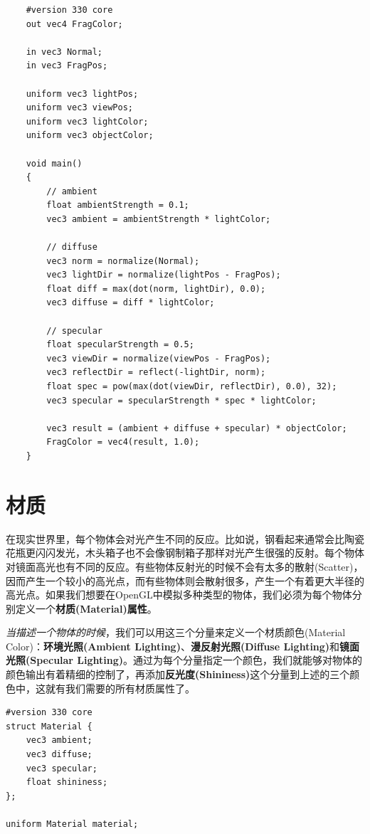 \documentclass[UTF8,a4paper,12pt]{ctexbook}
\begin{document}
				\begin{lstlisting}
	#version 330 core
	out vec4 FragColor;
	
	in vec3 Normal;  
	in vec3 FragPos;  
	  
	uniform vec3 lightPos; 
	uniform vec3 viewPos; 
	uniform vec3 lightColor;
	uniform vec3 objectColor;
	
	void main()
	{
	    // ambient
	    float ambientStrength = 0.1;
	    vec3 ambient = ambientStrength * lightColor;
	  	
	    // diffuse 
	    vec3 norm = normalize(Normal);
	    vec3 lightDir = normalize(lightPos - FragPos);
	    float diff = max(dot(norm, lightDir), 0.0);
	    vec3 diffuse = diff * lightColor;
	    
	    // specular
	    float specularStrength = 0.5;
	    vec3 viewDir = normalize(viewPos - FragPos);
	    vec3 reflectDir = reflect(-lightDir, norm);  
	    float spec = pow(max(dot(viewDir, reflectDir), 0.0), 32);
	    vec3 specular = specularStrength * spec * lightColor;  
	        
	    vec3 result = (ambient + diffuse + specular) * objectColor;
	    FragColor = vec4(result, 1.0);
	} 				
				\end{lstlisting}
			
			
			
	\section{材质}
		在现实世界里，每个物体会对光产生不同的反应。比如说，钢看起来通常会比陶瓷花瓶更闪闪发光，木头箱子也不会像钢制箱子那样对光产生很强的反射。每个物体对镜面高光也有不同的反应。有些物体反射光的时候不会有太多的散射(Scatter)，因而产生一个较小的高光点，而有些物体则会散射很多，产生一个有着更大半径的高光点。如果我们想要在OpenGL中模拟多种类型的物体，我们必须为每个物体分别定义一个\textbf{材质(Material)属性}。
		
		\textit{当描述一个物体的时候}，我们可以用这三个分量来定义一个材质颜色(Material Color)：\textbf{环境光照(Ambient Lighting)}、\textbf{漫反射光照(Diffuse Lighting)}和\textbf{镜面光照(Specular Lighting)}。通过为每个分量指定一个颜色，我们就能够对物体的颜色输出有着精细的控制了，再添加\textbf{反光度(Shininess)}这个分量到上述的三个颜色中，这就有我们需要的所有材质属性了。
		
		\begin{lstlisting}
#version 330 core
struct Material {
	vec3 ambient;
	vec3 diffuse;
	vec3 specular;
	float shininess;
}; 

uniform Material material;		
		\end{lstlisting}
		
\end{document}
